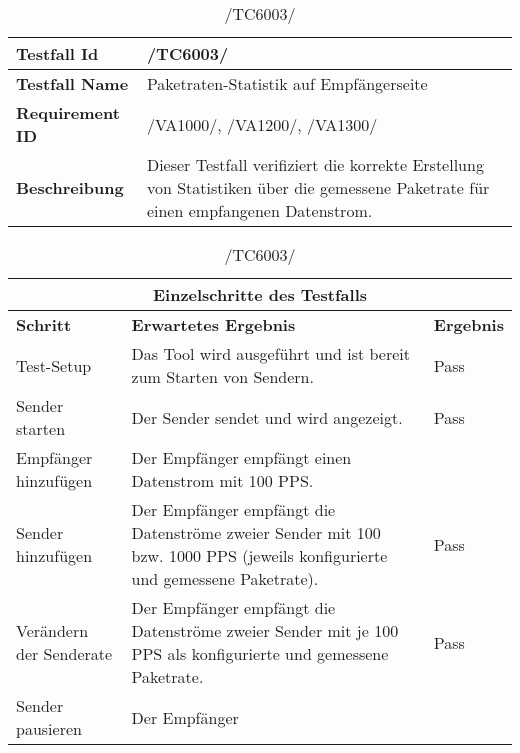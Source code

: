     \begin{table}[h]
        \caption{/TC6003/}
        \label{tab:TC6003}
        \begin{center}
            \begin{tabular}{|p{3.5cm}|p{12cm}|}
                \hline
                    \textbf{Testfall Id} & /TC6003/\\
                \hline
                    \textbf{Testfall Name} & Paketraten-Statistik auf
                    Empfängerseite\\
                \hline
                    \textbf{Requirement ID} & /VA1000/, /VA1200/, /VA1300/\\
                \hline
                    \textbf{Beschreibung} & Dieser Testfall verifiziert die
                    korrekte Erstellung von Statistiken über die
                    gemessene Paketrate für einen empfangenen Datenstrom.\\
                \hline
            \end{tabular}
            \begin{tabular}{|p{2.5cm}|p{7.55cm}|p{5cm}|}
                \multicolumn{3}{|c|}{\textbf{Einzelschritte des Testfalls}} \\
                \hline
                    \textbf{Schritt} & \textbf{Erwartetes Ergebnis} &
                    \textbf{Ergebnis}\\
                \hline
                    Test-Setup & Das Tool
                    wird ausgeführt und ist bereit zum Starten von Sendern. &
                    Pass\\
                \hline
                    Sender starten & Der
                    Sender sendet und wird angezeigt. & Pass\\
                \hline
                    Empfänger hinzufügen & Der Empfänger empfängt einen Datenstrom mit 100 PPS.\\
                \hline
                    Sender hinzufügen & Der Empfänger empfängt die Datenströme zweier Sender mit 100 bzw. 1000
                    PPS (jeweils konfigurierte und gemessene Paketrate). &
                    Pass\\
                \hline
                    Verändern der Senderate & Der Empfänger empfängt die Datenströme
                    zweier Sender mit je 100 PPS als konfigurierte und
                    gemessene Paketrate. & Pass\\
                \hline
                    Sender pausieren & Der Empfänger

\end{tabular}
\end{center}
\end{table}
